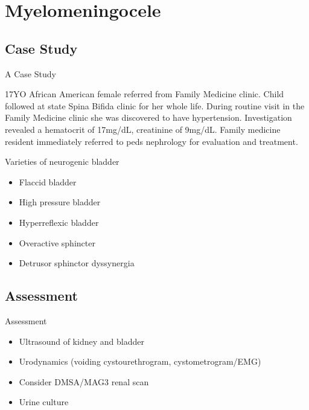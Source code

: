\section{Myelomeningocele}\label{myelomeningocele}

\frame{\tableofcontents[hideothersubsections]}

\subsection{Case Study}\label{case-study}

\begin{frame}{A Case Study}

17YO African American female referred from Family Medicine clinic. Child
followed at state Spina Bifida clinic for her whole life. During routine
visit in the Family Medicine clinic she was discovered to have
hypertension. Investigation revealed a hematocrit of 17mg/dL, creatinine
of 9mg/dL. Family medicine resident immediately referred to peds
nephrology for evaluation and treatment.

\end{frame}

\begin{frame}{Varieties of neurogenic bladder}

\begin{itemize}
\itemsep1pt\parskip0pt
\item
  Flaccid bladder
\item
  High pressure bladder
\item
  Hyperreflexic bladder
\item
  Overactive sphincter
\item
  Detrusor sphinctor dyssynergia
\end{itemize}

\end{frame}

\subsection{Assessment}\label{assessment}

\begin{frame}{Assessment}

\begin{itemize}
\itemsep1pt\parskip0pt
\item
  Ultrasound of kidney and bladder
\item
  Urodynamics (voiding cystourethrogram, cystometrogram/EMG)
\item
  Consider DMSA/MAG3 renal scan
\item
  Urine culture
\end{itemize}

\end{frame}

